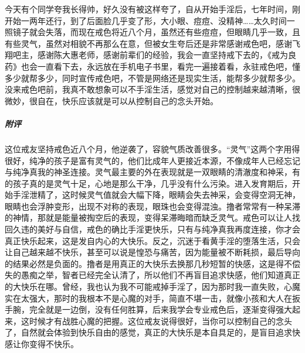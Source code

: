 \begin{case}
    今天有个同学夸我长得帅，好久没有被这样夸了，自从开始手淫后，七年时间，刚开始一两年还行，到了后面脸几乎变了形，大小眼、痘痘、没精神……太久时间一照镜子就会失落，而现在戒色将近八个月，虽然还有些痘痘，但眼睛几乎一致，且有些灵气，虽然对相貌不再那么在意，但被女生夸后还是非常感谢戒色吧，感谢飞翔吧主，感谢陈大惠老师，感谢前辈们的经验，我会一直坚持戒下去的，《戒为良药》也会一直看下去，永远放在手机电子书里，看完一遍接着看，永驻戒色吧，懂多少就帮多少，同时宣传戒色吧，不管是网络还是现实生活，能帮多少就帮多少。没来戒色吧前，我真不敢想象可以不手淫生活，感觉对自己的控制越来越清晰，很微妙，很自在，快乐应该就是可以从控制自己的念头开始。
    \subparagraph{附评} 这位戒友坚持戒色近八个月，他逆袭了，容貌气质改善很多。“灵气”这两个字用得很好，纯净的孩子是富有灵气的，他们比成年人更接近本源，不像成年人已经忘记与纯净真我的神圣连接。灵气最主要的外在表现就是一双眼睛的清澈度和神采，有的孩子真的是灵气十足，心地是那么干净，几乎没有什么污染。进入发育期后，开始手淫泄精了，这时候灵气值就会大幅下降，眼睛会失去神采，会变得空洞无神，眼睛也会浮肿变形，出现不对称的表现，眼珠也会变得混浊。撸者常常有一种呆滞的神情，那就是能量被掏空后的表现，变得呆滞晦暗而缺乏灵气。戒色可以让人找回久违的美好与自信，戒色的确比手淫更快乐，只有与纯净真我再度连接，你才会真正快乐起来，这是发自内心的大快乐。反之，沉迷于看黄手淫的堕落生活，只会让自己越来越不快乐，甚至可以说是惶恐与痛苦，因为能量被不断耗损，最后导向的结果必然是负面的。撸者是用真正的大快乐去换那几秒短暂的快感，这是得不偿失的愚痴之举，智者已经完全认清了，所以他们不再盲目追求快感，他们知道真正的大快乐在哪。曾经，我也认为我不可能戒掉手淫了，因为那时我一直失败，心魔实在太强大，那时的我根本不是心魔的对手，简直不堪一击，就像小孩和大人在扳手腕，完全就是一边倒，没有任何胜算，后来我学会专业戒色后，逐渐变得强大起来，这时候才有战胜心魔的把握。这位戒友说得很好，当你可以控制自己的念头了，自然就会体验到快乐自由的感觉，真正的大快乐是本自具足的，是盲目追求快感让你变得不快乐。
\end{case}

